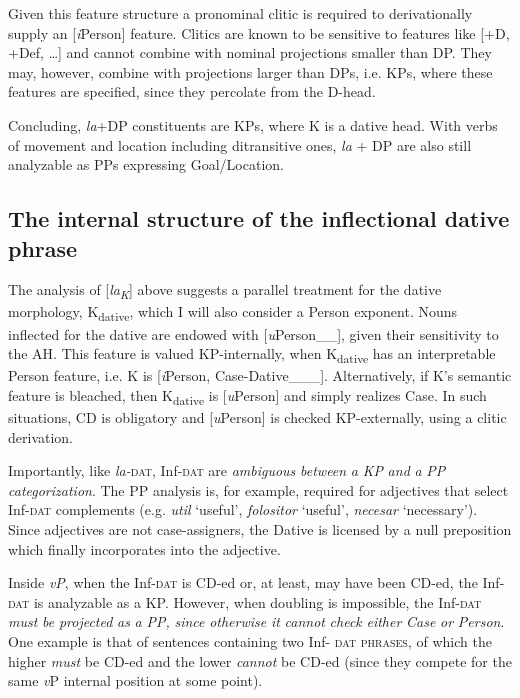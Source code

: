 \documentclass[output=paper,modfonts,nonflat,newtxmath]{langsci/langscibook}
\begin{document}
Given this feature structure a pronominal clitic is required to derivationally supply an [\textit{i}Person] feature. Clitics are known to be sensitive to features like [+D, +Def, …] and cannot combine with nominal projections smaller than DP. They may, however, combine with projections larger than DPs, i.e. KPs, where these features are specified, since they percolate from the D-head. 

Concluding, \textit{la}+DP constituents are KPs, where K is a dative head. With verbs of movement and location including ditransitive ones, \textit{la} + DP are also still analyzable as PPs expressing Goal/Location.

\subsection{{The} {internal} {structure} {of} {the} {inflectional} {dative} {phrase}}%
\label{sec:cornilescu:2.4}

The analysis of [\textit{la\textsubscript{K}}] above suggests a parallel treatment for the dative morphology, K\textsubscript{dative}, which I will also consider a Person exponent. Nouns inflected for the dative are endowed with [\textit{u}Person\_\_], given their sensitivity to the AH. This feature is valued KP-internally, when K\textsubscript{dative} has an interpretable Person feature, i.e. K is [\textit{i}Person, Case-Dative\_\_\_]. Alternatively, if K’s semantic feature is bleached, then K\textsubscript{dative} is [\textit{u}Person] and simply realizes Case. In such situations, CD is obligatory and [\textit{u}Person] is checked KP-externally, using a clitic derivation. 

Importantly, like \textit{la-}\textsc{dat}, Inf-\textsc{dat} are \textit{ambiguous} \textit{between} \textit{a} \textit{KP} \textit{and} \textit{a} \textit{PP} \textit{categorization}. The PP analysis is, for example, required for adjectives that select Inf-\textsc{dat} complements (e.g. \textit{util} ‘useful’, \textit{folositor} ‘useful’, \textit{necesar} ‘necessary’). Since adjectives are not case-assigners, the Dative is licensed by a null preposition which finally incorporates into the adjective.

Inside \textit{vP}, when the Inf-\textsc{dat} is CD-ed or, at least, may have been CD-ed, the Inf-\textsc{dat} is analyzable as a KP. However, when doubling is impossible, the Inf-\textsc{dat} \textit{must} \textit{be} \textit{projected} \textit{as} \textit{a} \textit{PP,} \textit{since} \textit{otherwise} \textit{it} \textit{cannot} \textit{check} \textit{either} \textit{Case} \textit{or} \textit{Person}. One example is that of sentences containing two Inf- \textsc{dat} \textsc{phrases}, of which the higher \textit{must} be CD-ed and the lower \textit{cannot} be CD-ed (since they compete for the same \textit{v}P internal position at some point).
\end{document}
